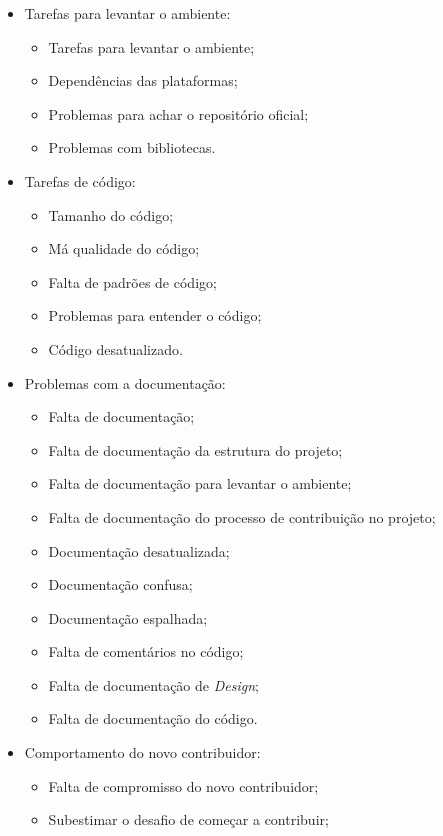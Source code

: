 \begin{itemize}

\item Tarefas para levantar o ambiente: 

	\begin{itemize}
	\item Tarefas para levantar o ambiente; 
	\item Dependências das plataformas;
	\item Problemas para achar o repositório oficial;
	\item Problemas com bibliotecas.
	\end{itemize}

\item Tarefas de código:
	
	\begin{itemize}
	\item Tamanho do código;
	\item Má qualidade do código;
	\item Falta de padrões de código;
	\item Problemas para entender o código;
	\item Código desatualizado.
	\end{itemize}

\item Problemas com a documentação:

	\begin{itemize}
	\item Falta de documentação;
	\item Falta de documentação da estrutura do projeto;
	\item Falta de documentação para levantar o ambiente;
	\item Falta de documentação do processo de contribuição no projeto;
	\item Documentação desatualizada;
	\item Documentação confusa;
	\item Documentação espalhada;
	\item Falta de comentários no código;
	\item Falta de documentação de \textit{Design};
	\item Falta de documentação do código.
	\end{itemize}

\item Comportamento do novo contribuidor:

	\begin{itemize}
	\item Falta de compromisso do novo contribuidor;
	\item Subestimar o desafio de começar a contribuir;
	\end{itemize}


\end{itemize}
